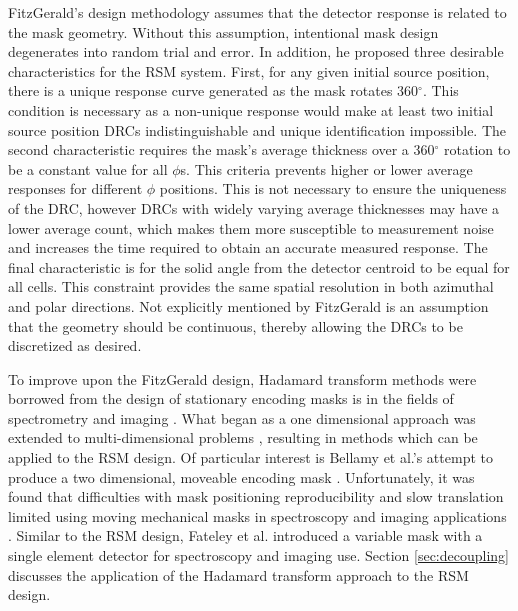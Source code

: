 \documentclass[3p,times]{elsarticle}
\begin{document}
FitzGerald's design methodology assumes that the detector response is related to the mask geometry.  
Without this assumption, intentional mask design degenerates into random trial and error.
In addition, he proposed three desirable characteristics for the RSM system.  
First, for any given initial source position, there is a unique response curve generated as the mask rotates 360$^\circ$.  
This condition is necessary as a non-unique response would make at least two initial source position DRCs indistinguishable and unique identification impossible.
The second characteristic requires the mask's average thickness over a 360$^\circ$ rotation to be a constant value for all $\phi$s.  
This criteria prevents higher or lower average responses for different $\phi$ positions. 
This is not necessary to ensure the uniqueness of the DRC, however DRCs with widely varying average thicknesses may have a lower average count, which makes them more susceptible to measurement noise and increases the time required to obtain an accurate measured response.
The final characteristic is for the solid angle from the detector centroid to be equal for all cells.  
This constraint provides the same spatial resolution in both azimuthal and polar directions.
Not explicitly mentioned by FitzGerald is an assumption that the geometry should be continuous, thereby allowing the DRCs to be discretized as desired.

To improve upon the FitzGerald design, Hadamard transform methods were borrowed from the design of stationary encoding masks is in the fields of spectrometry and 
imaging \cite{Sloane76, Dyer91, Finger85}. 
What began as a one dimensional approach was extended to multi-dimensional problems \cite{Hammaker95, Hanley00, DeVerse00}, resulting in methods which can be applied to the RSM design.
Of particular interest is Bellamy et al.'s attempt to produce a two
dimensional, moveable encoding mask \cite{Bellamy97}.  Unfortunately, it was found that difficulties with mask positioning reproducibility and slow translation 
limited using moving mechanical masks in spectroscopy and imaging applications \cite{DeVerse00}.
Similar to the RSM design, Fateley et al. introduced a variable mask with a single element detector \cite{Fateley02} for spectroscopy and imaging use.  
Section \ref{sec:decoupling} discusses the application of the Hadamard transform approach to the RSM design.
\end{document}
